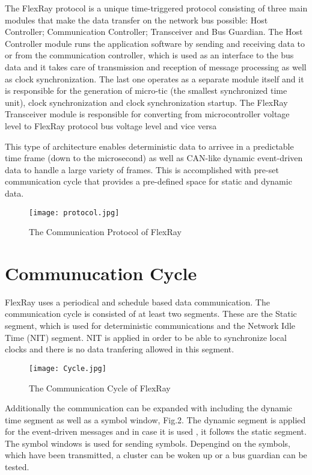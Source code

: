 \documentclass[conference]{IEEEtran}
\begin{document}
The FlexRay protocol is a unique time-triggered protocol consisting of three main modules that make the data transfer on the network bus possible: Host Controller; Communication Controller;  Transceiver and Bus Guardian.
The Host Controller module runs the application software by sending and receiving data to or from the communication controller, which is used as an interface to the bus data and it takes care of transmission and reception of message processing as well as clock synchronization. The last one operates as a separate module itself and it is responsible for the generation of micro-tic (the smallest synchronized time unit), clock synchronization and clock synchronization startup.
The FlexRay Transceiver module is responsible for converting from microcontroller voltage level to FlexRay protocol bus voltage level and vice versa

This type of architecture enables deterministic data to arrivee in a predictable time frame (down to the microsecond) as well as CAN-like dynamic event-driven data to handle a large variety of frames. This is accomplished with pre-set communication cycle that provides a pre-defined space for static and dynamic data.

\begin{figure}[htbp]
 \centerline{ \texttt{[image: protocol.jpg]}}
  \caption{The Communication Protocol of FlexRay}
  \label{fig:protocol}
\end{figure}
\section{Communucation Cycle}
FlexRay uses a periodical and schedule based data communication. The communication cycle is consisted of at least two segments. These are the Static segment, which is used for deterministic communications and the Network Idle Time (NIT) segment. NIT is applied in order to be able to synchronize local clocks and there is no data tranfering allowed in this segment.
\begin{figure}[htbp]
 \centerline{ \texttt{[image: Cycle.jpg]}}
  \caption{The Communication Cycle of FlexRay}
  \label{fig:cycle}
\end{figure}

Additionally the communication can be expanded with including the dynamic time segment as well as a symbol window, Fig.2. The dynamic segment is applied for the event-driven messages and in case it is used , it follows the static segment. The symbol windows is used for sending symbols. Depengind on the symbols, which have been transmitted, a cluster can be  woken up or a bus guardian can be tested.
\end{document}
